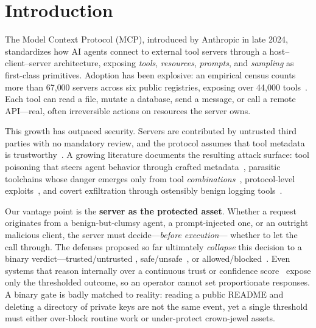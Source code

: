 \documentclass[conference]{IEEEtran}
\begin{document}
\section{Introduction}

The Model Context Protocol (MCP), introduced by Anthropic in late 2024,
standardizes how AI agents connect to external tool servers through a
host--client--server architecture, exposing \emph{tools}, \emph{resources},
\emph{prompts}, and \emph{sampling} as first-class primitives. Adoption has been
explosive: an empirical census counts more than 67{,}000 servers across six
public registries, exposing over 44{,}000 tools~\cite{li2025understanding_mcp}.
Each tool can read a file, mutate a database, send a message, or call a remote
API---real, often irreversible actions on resources the server owns.

This growth has outpaced security. Servers are contributed by untrusted third
parties with no mandatory review, and the protocol assumes that tool metadata is
trustworthy~\cite{hou2025mcp_landscape}. A growing literature documents the
resulting attack surface: tool poisoning that steers agent behavior through
crafted metadata~\cite{wang2025mcptox,li2026mcp_itp}, parasitic toolchains whose
danger emerges only from tool \emph{combinations}~\cite{zhao2025mind_your_server},
protocol-level exploits~\cite{maloyan2026breaking_protocol}, and covert
exfiltration through ostensibly benign logging tools~\cite{hu2026log_to_leak}.

Our vantage point is the \textbf{server as the protected asset}. Whether a
request originates from a benign-but-clumsy agent, a prompt-injected one, or an
outright malicious client, the server must decide---\emph{before execution}---
whether to let the call through. The defenses proposed so far ultimately
\emph{collapse} this decision to a binary verdict---trusted/untrusted
\cite{zhou2026mcpshield}, safe/unsafe~\cite{xing2026mcp_guard,mou2026toolsafe,xiang2025guardagent},
or allowed/blocked~\cite{shi2025progent,buhler2025agentbound}. Even systems that
reason internally over a continuous trust or confidence
score~\cite{zhou2026mcpshield} expose only the thresholded outcome, so an operator
cannot set proportionate responses. A binary gate is badly matched to reality:
reading a public README and deleting a directory of private keys are not the same
event, yet a single threshold must either over-block routine work or under-protect
crown-jewel assets.
\end{document}
